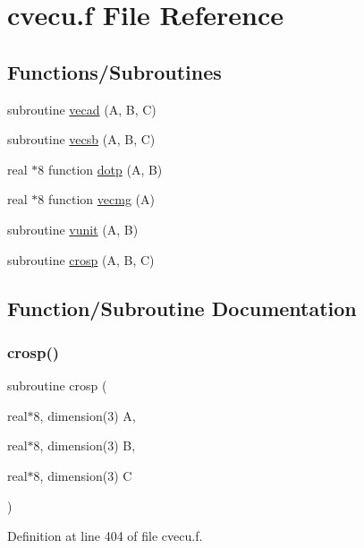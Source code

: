 \hypertarget{cvecu_8f}{}\section{cvecu.\+f File Reference}
\label{cvecu_8f}
\subsection*{Functions/\+Subroutines}
\begin{DoxyCompactItemize}
\item 
subroutine \hyperlink{cvecu_8f_af996c47f35e2c9be1c2fd2debd8dbd4c}{vecad} (A, B, C)
\item 
subroutine \hyperlink{cvecu_8f_a6a89e2feb2a4f077a63790728a419430}{vecsb} (A, B, C)
\item 
real $\ast$8 function \hyperlink{cvecu_8f_ad6a81c2e4afb6da85999b1e5bbcc42ce}{dotp} (A, B)
\item 
real $\ast$8 function \hyperlink{cvecu_8f_a0d1fc3ffaf70a09d072d55c2e452429d}{vecmg} (A)
\item 
subroutine \hyperlink{cvecu_8f_aae62c79991a1deff14e6de9f607c76cb}{vunit} (A, B)
\item 
subroutine \hyperlink{cvecu_8f_a84bae3d15e7126edb08162bc53b03f24}{crosp} (A, B, C)
\end{DoxyCompactItemize}


\subsection{Function/\+Subroutine Documentation}
\mbox{\label{cvecu_8f_a84bae3d15e7126edb08162bc53b03f24}} 
\subsubsection{\texorpdfstring{crosp()}{crosp()}}
{\footnotesize\ttfamily subroutine crosp (\begin{DoxyParamCaption}\item[{real$\ast$8, dimension(3)}]{A,  }\item[{real$\ast$8, dimension(3)}]{B,  }\item[{real$\ast$8, dimension(3)}]{C }\end{DoxyParamCaption})}



Definition at line 404 of file cvecu.\+f.



